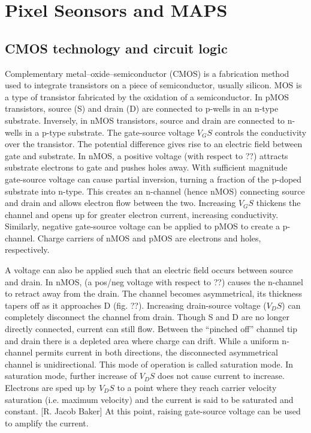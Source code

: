 \section{Pixel Seonsors and MAPS}
\label{sec:PixelSens&MAPS}

\subsection{CMOS technology and circuit logic}

Complementary metal–oxide–semiconductor (CMOS) is a fabrication method used to integrate transistors on a piece of semiconductor, usually silicon. MOS is a type of transistor fabricated by the oxidation of a semiconductor. In pMOS transistors, source (S) and drain (D) are connected to p-wells in an n-type substrate. Inversely, in nMOS transistors, source and drain are connected to n-wells in a p-type substrate.
The gate-source voltage $V_GS$ controls the conductivity over the transistor. The potential difference gives rise to an electric field between gate and substrate.
In nMOS, a positive voltage (with respect to ??) attracts substrate electrons to gate and pushes holes away. With sufficient magnitude gate-source voltage can cause partial inversion, turning a fraction of the p-doped substrate into n-type. This creates an n-channel (hence nMOS) connecting source and drain and allows electron flow between the two. Increasing $V_GS$ thickens the channel and opens up for greater electron current, increasing conductivity. Similarly, negative gate-source voltage can be applied to pMOS to create a p-channel. Charge carriers of nMOS and pMOS are electrons and holes, respectively.

A voltage can also be applied such that an electric field occurs between source and drain. In nMOS, (a pos/neg voltage with respect to ??) causes the n-channel to retract away from the drain. The channel becomes asymmetrical, its thickness tapers off as it approaches D (fig. ??). Increasing drain-source voltage ($V_DS$) can completely disconnect the channel from drain. Though S and D are no longer directly connected, current can still flow. Between the “pinched off” channel tip and drain there is a depleted area where charge can drift. While a uniform n-channel permits current in both directions, the disconnected asymmetrical channel is unidirectional. This mode of operation is called saturation mode.
In saturation mode, further increase of $V_DS$ does not cause current to increase. Electrons are sped up by $V_DS$ to a point where they reach carrier velocity saturation (i.e. maximum velocity) and the current is said to be saturated and constant. [R. Jacob Baker] At this point, raising gate-source voltage can be used to amplify the current.

